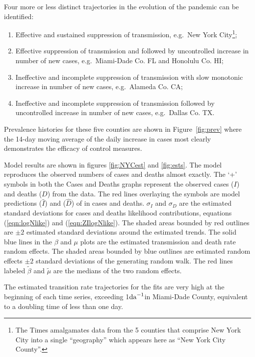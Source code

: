 \documentclass[12pt,letterpaper]{article}
\newcommand\help[1]{\color{Magenta}{\it #1 }\normalcolor}
\newcommand\EG{e.g.\ }
\newcommand\perda{$\rm{da}^{-1}$}
\begin{document}
Four more or less distinct trajectories in the evolution of the
pandemic can be identified:
\begin{enumerate}
\item Effective and sustained suppression of transmission, 
\EG New York City\footnote{The Times amalgamates data
from the 5 counties that comprise New York City into a single
``geography'' which appears here as ``New York City County''.};
\item Effective suppression of transmission and followed by
uncontrolled increase in number of new cases, \EG Miami-Dade Co. FL
and Honolulu Co. HI;
\item Ineffective and incomplete suppression of transmission with
slow monotonic increase in number of new cases, \EG Alameda Co. CA;
\item Ineffective and incomplete suppression of transmission 
followed by uncontrolled increase in number of new cases, \EG Dallas
Co. TX.
\end{enumerate}
Prevalence histories for these five counties are shown in
Figure~\ref{fig:prev} where the 14-day moving average of the daily
increase in cases most clearly
demonstrates the efficacy of control measures.

Model results are shown in figures \ref{fig:NYCest}
and \ref{fig:ests}.
The model reproduces the observed numbers of cases and deaths almost
exactly. \help{(With errors of approximately 1 case or death.)}
The `+' symbols in both the Cases and Deaths graphs represent the observed
cases ($I$) and deaths ($D$) from the data. 
The red lines overlaying the symbols are model predictions ($\widehat{I}$)
and ($\widehat{D}$) of in cases and deaths. 
$\sigma_I$ and $\sigma_D$ are the estimated standard deviations for
cases and deaths likelihood contributions, equations (\ref{eqn:logNlike}) 
and (\ref{eqn:ZIlogNlike}).
The shaded areas bounded by red outlines are 
$\pm 2$ estimated standard deviations around the estimated trends.
The solid blue lines in the $\beta$ and $\mu$ plots are the estimated
transmission and death rate random effects.
The shaded areas bounded by blue outlines are
estimated random effects $\pm 2$ standard deviations of the generating
random walk.
The red lines labeled $\tilde{\beta}$ and $\tilde{\mu}$ are the
medians of the two random effects.


The estimated transition rate trajectories for the fits are very high
at the beginning of each time series, exceeding 1\perda in Miami-Dade
County, equivalent to a doubling time of less than one day.
\end{document}
